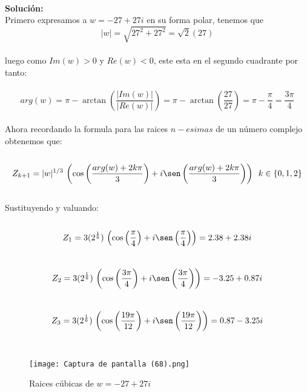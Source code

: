 \documentclass[11pt,letterpaper]{article}
\begin{document}
\,\\
\textbf{Soluci\'on:}
    \,\\
    Primero expresamos a $w=-27+27i$ en su forma polar, tenemos que\,\\
    \begin{equation*}
        |w|=\sqrt{27^2+27^2}=\sqrt{2}(27)
    \end{equation*}\,\\
    luego como $Im(w)>0$ y $Re(w)<0$, este esta en el segundo cuadrante por tanto:\,\\
    \,\\
    \begin{equation*}
        arg(w)=\pi-\arctan\left(\frac{|Im(w)|}{|Re(w)|}\right)=\pi-\arctan\left(\frac{27}{27}\right)=\pi-\frac{\pi}{4}=\frac{3\pi}{4}
    \end{equation*}\,\\
    Ahora recordando la formula para las raices $n-esimas$ de un n\'umero complejo obtenemos que:\,\\
    \,\\
    \begin{equation*}
        Z_{k+1}=|w|^{1/3}\,\left(\cos\left(\frac{arg(w)+2k\pi}{3}\right)+i\sen\left(\frac{arg(w)+2k\pi}{3}\right)\right)\,\,\,k\in\{0,1,2\}
    \end{equation*}\,\\
    Sustituyendo y valuando:\,\\
    \,\\
    \begin{equation*}
        Z_1=3(2^{\frac{1}{6}})\,\left(\cos\left(\frac{\pi}{4}\right)+i\sen\left(\frac{\pi}{4}\right)\right)=2.38+2.38i
    \end{equation*}
    \,\\
    \begin{equation*}
        Z_2=3(2^{\frac{1}{6}})\,\left(\cos\left(\frac{3\pi}{4}\right)+i\sen\left(\frac{3\pi}{4}\right)\right)=-3.25+0.87i
    \end{equation*}
\,\\
    \begin{equation*}
        Z_3=3(2^{\frac{1}{6}})\,\left(\cos\left(\frac{19\pi}{12}\right)+i\sen\left(\frac{19\pi}{12}\right)\right)=0.87-3.25i
    \end{equation*}
    \,\\
    \begin{figure}[htb]
    \centering
    \texttt{[image: Captura de pantalla (68).png]}
    \caption{Raices c\'ubicas de $w=-27+27i$}
    \label{Cono rebanado}
\end{figure}
\end{document}
